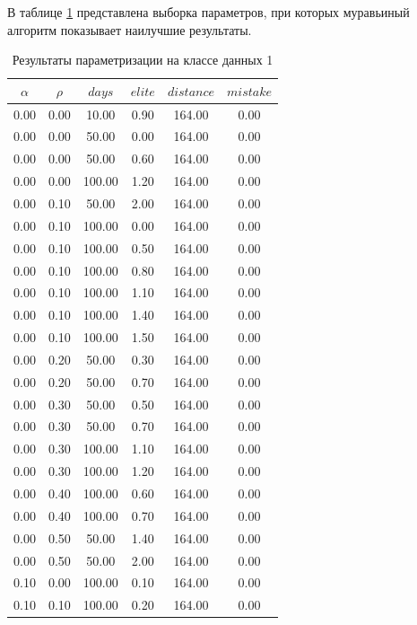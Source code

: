 В таблице \ref{tbl:test1} представлена выборка параметров, при которых муравьиный алгоритм показывает наилучшие результаты.

\begin{table}
	\caption{Результаты параметризации на классе данных 1\label{tbl:test1}}
	\begin{tabular}[c]{|c|c|c|c|c|c|}
        \hline
		$\alpha$ & $\rho$ & $days$ & $elite$ & $distance$ & $mistake$ \\
		\hline
        0.00 & 0.00 & 10.00 & 0.90 & 164.00 & 0.00 \\
        0.00 & 0.00 & 50.00 & 0.00 & 164.00 & 0.00 \\
        0.00 & 0.00 & 50.00 & 0.60 & 164.00 & 0.00 \\
        0.00 & 0.00 & 100.00 & 1.20 & 164.00 & 0.00 \\
        0.00 & 0.10 & 50.00 & 2.00 & 164.00 & 0.00 \\
        0.00 & 0.10 & 100.00 & 0.00 & 164.00 & 0.00 \\
        0.00 & 0.10 & 100.00 & 0.50 & 164.00 & 0.00 \\
        0.00 & 0.10 & 100.00 & 0.80 & 164.00 & 0.00 \\
        0.00 & 0.10 & 100.00 & 1.10 & 164.00 & 0.00 \\
        0.00 & 0.10 & 100.00 & 1.40 & 164.00 & 0.00 \\
        0.00 & 0.10 & 100.00 & 1.50 & 164.00 & 0.00 \\
        0.00 & 0.20 & 50.00 & 0.30 & 164.00 & 0.00 \\
        0.00 & 0.20 & 50.00 & 0.70 & 164.00 & 0.00 \\
        0.00 & 0.30 & 50.00 & 0.50 & 164.00 & 0.00 \\
        0.00 & 0.30 & 50.00 & 0.70 & 164.00 & 0.00 \\
        0.00 & 0.30 & 100.00 & 1.10 & 164.00 & 0.00 \\
        0.00 & 0.30 & 100.00 & 1.20 & 164.00 & 0.00 \\
        0.00 & 0.40 & 100.00 & 0.60 & 164.00 & 0.00 \\
        0.00 & 0.40 & 100.00 & 0.70 & 164.00 & 0.00 \\
        0.00 & 0.50 & 50.00 & 1.40 & 164.00 & 0.00 \\
        0.00 & 0.50 & 50.00 & 2.00 & 164.00 & 0.00 \\
        0.10 & 0.00 & 100.00 & 0.10 & 164.00 & 0.00 \\
        0.10 & 0.10 & 100.00 & 0.20 & 164.00 & 0.00 \\

\end{tabular}
\end{table}

